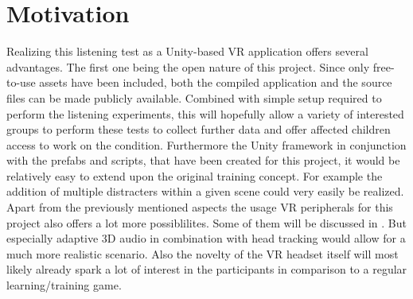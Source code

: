 \documentclass[a4paper,11pt]{article}%
\renewcommand{\\}{\vspace*{0.5\baselineskip} \newline}
\begin{document}


\section{Motivation}
\label{sec:motivation}
Realizing this listening test as a Unity-based VR application offers several advantages. The first one being the open nature of this project. Since only free-to-use assets have been included, both the compiled application and the source files can be made publicly available. Combined with simple setup required to perform the listening experiments, this will hopefully allow a variety of interested groups to perform these tests to collect further data and offer affected children access to work on the condition.
\newline
\newline
Furthermore the Unity framework in conjunction with the prefabs and scripts, that have been created for this project, it would be relatively easy to extend upon the original training concept. For example the addition of multiple distracters within a given scene could very easily be realized.
\newline
\newline
Apart from the previously mentioned aspects the usage VR peripherals for this project also offers a lot more possiblilites. Some of them will be discussed in . But especially adaptive 3D audio in combination with head tracking would allow for a much more realistic scenario. Also the novelty of the VR headset itself will most likely already spark a lot of interest in the participants in comparison to a regular learning/training game.
 
\end{document}
